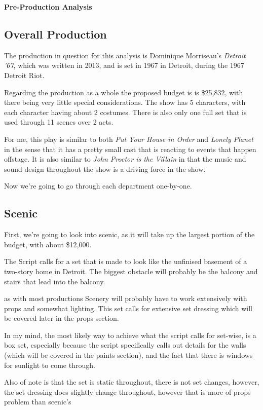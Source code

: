 \documentclass[12pt]{article}
\begin{document}
\begin{doublespace}
\vspace*{20pt}
\begin{center} \textbf{Pre-Production Analysis} \end{center}


\subsection*{Overall Production}
    \par The production in question for this analysis is Dominique Morriseau's \textit{Detroit '67}, which was written in 2013, and is set in 1967 in Detroit, during the 1967 Detroit Riot.
    \par Regarding the production as a whole the proposed budget is is \$25,832, with there being very little special considerations. The show has 5 characters, with each character having about 2 costumes. There is also only one full set that is used through 11 scenes over 2 acts.
    \par For me, this play is similar to both \textit{Put Your House in Order} and \textit{Lonely Planet} in the sense that it has a pretty small cast that is reacting to events that happen offstage. It is also similar to \textit{John Proctor is the Villain} in that the music and sound design throughout the show is a driving force in the show.
    \par Now we're going to go through each department one-by-one.

\subsection*{Scenic}
    \par First, we're going to look into scenic, as it will take up the largest portion of the budget, with about \$12,000. 
    \par The Script calls for a set that is made to look like the unfinised basement of a two-story home in Detroit. The biggest obstacle will probably be the balcony and stairs that lead into the balcony.
    \par as with most productions Scenery will probably have to work extensively with props and somewhat lighting. This set calls for extensive set dressing which will be covered later in the props section.
    \par In my mind, the most likely way to achieve what the script calls for set-wise, is a box set, especially because the script specifically calls out details for the walls (which will be covered in the paints section), and the fact that there is windows for sunlight to come through.
    \par Also of note is that the set is static throughout, there is not set changes, however, the set dressing does slightly change throughout, however that is more of props problem than scenic's

\end{doublespace}
\end{document}
